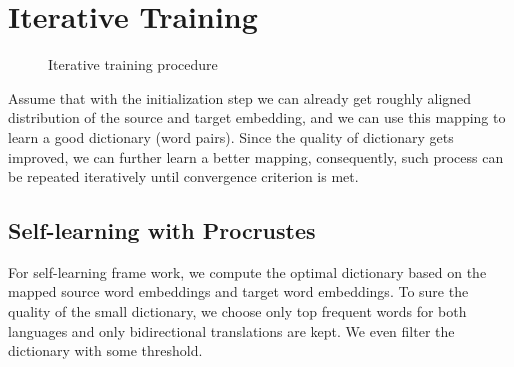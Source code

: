 \section{Iterative Training}
\begin{figure}[h]
	\centering
	\begin{minipage}{.7\linewidth}
		\begin{algorithm}[H]
			\SetAlgoLined
			
			\caption{Iterative training procedure}
		\end{algorithm}
	\end{minipage}
\end{figure}
Assume that with the initialization step we can already get roughly aligned distribution of the source and target embedding, and we can use this mapping to learn a good dictionary (word pairs). Since the quality of dictionary gets improved, we can further learn a better mapping, consequently, such process can be repeated iteratively until convergence criterion is met.
\subsection{Self-learning with Procrustes}
For self-learning frame work, we compute the optimal dictionary based on the mapped source word embeddings and target word embeddings. To sure the quality of the small dictionary, we choose only top frequent words for both languages and only bidirectional translations are kept. We even filter the dictionary with some threshold.


